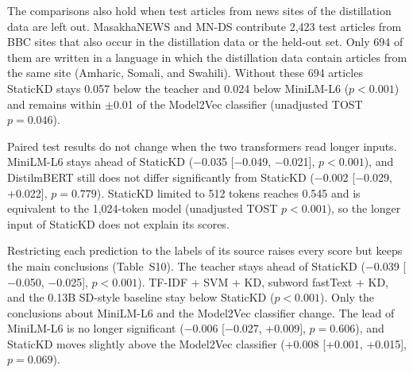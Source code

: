 \documentclass{ieeeaccess}
\begin{document}
The comparisons also hold when test articles from news sites of the distillation data are left out. MasakhaNEWS and MN-DS contribute 2,423 test articles from BBC sites that also occur in the distillation data or the held-out set. Only 694 of them are written in a language in which the distillation data contain articles from the same site (Amharic, Somali, and Swahili). Without these 694 articles StaticKD stays 0.057 below the teacher and 0.024 below MiniLM-L6 ($p<0.001$) and remains within $\pm$0.01 of the Model2Vec classifier (unadjusted TOST $p=0.046$).

Paired test results do not change when the two transformers read longer inputs. MiniLM-L6 stays ahead of StaticKD ($-$0.035 [$-$0.049, $-$0.021], $p<0.001$), and DistilmBERT still does not differ significantly from StaticKD ($-$0.002 [$-$0.029, +0.022], $p=0.779$). StaticKD limited to 512 tokens reaches 0.545 and is equivalent to the 1,024-token model (unadjusted TOST $p<0.001$), so the longer input of StaticKD does not explain its scores.

Restricting each prediction to the labels of its source raises every score but keeps the main conclusions (Table~S10). The teacher stays ahead of StaticKD ($-$0.039 [$-$0.050, $-$0.025], $p<0.001$). TF-IDF + SVM + KD, subword fastText + KD, and the 0.13B SD-style baseline stay below StaticKD ($p<0.001$). Only the conclusions about MiniLM-L6 and the Model2Vec classifier change. The lead of MiniLM-L6 is no longer significant ($-$0.006 [$-$0.027, +0.009], $p=0.606$), and StaticKD moves slightly above the Model2Vec classifier (+0.008 [+0.001, +0.015], $p=0.069$).
\end{document}
